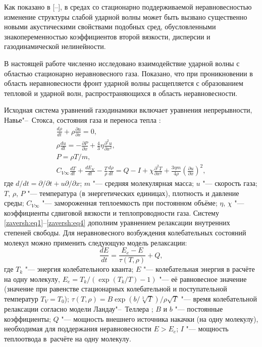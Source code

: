 Как показано в [--], в средах со стационарно поддерживаемой
неравновесностью изменение структуры слабой ударной волны может
быть вызвано существенно новыми акустическими свойствами подобных
сред, обусловленными знакопеременностью коэффициентов второй
вязкости, дисперсии и газодинамической нелинейности.

В настоящей работе   численно исследовано взаимодействие ударной
волны с областью стационарно неравновесного газа. Показано, что
при проникновении в область неравновесности фронт ударной волны
расщепляется с образованием тепловой и ударной волн,
распространяющихся в область неравновесности.

Исходная система уравнений газодинамики включает уравнения
непрерывности, Навье"--~Стокса, состояния газа и переноса тепла
\cite{zav:bib10,zav:bib11}:
     \begin{gather}
\frac{d\rho }{dt} +\rho \frac{\partial {u}}{\partial x}
=0,\label{zaversh:eq1}\\
\rho \frac{d{u}}{dt} =-\frac{\partial P}{\partial x} +\frac{4}{3}
\eta \frac{\partial^{2} {u}}{\partial x^{2}}
,\label{zaversh:eq2}\\
P=\rho T/m,\label{zaversh:eq3}\\
C_{V\infty } \frac{dT}{dt} +\frac{dE_{K} }{dt} -\frac{T}{\rho }
\frac{d\rho }{dt} =Q-I+\chi \frac{\partial^{2} T}{\partial x^{2}}
+\frac{3\eta m}{4\rho } \left(\frac{\partial {u}}{\partial x}
\right)^{2},\label{zaversh:eq4}
\end{gather}
где  $d/dt=\partial /\partial t+{u }\partial /\partial x$; $m$
"--- средняя молекулярная масса;  ${u}$  "--- скорость газа; $T$,
$\rho$, $P$  "--- температура (в энергетических единицах),
плотность и давление среды;  $C_{V\infty} $  "--- замороженная
теплоемкость при постоянном объёме;  $\eta$, $\chi $  "---
коэффициенты сдвиговой вязкости и теплопроводности газа. Систему \eqref{zaversh:eq1}--\eqref{zaversh:eq4} дополним уравнением релаксации внутренних степеней свободы. 
Для неравновесного возбуждения колебательных состояний молекул можно применить следующую модель релаксации:
\begin{equation}
\displaystyle \frac{dE}{dt} =\frac{E_{e} -E }{\tau(T,\rho )}
+Q,\label{zaversh:eq5}
\end{equation}
где $T_{k} $  "--- энергия колебательного кванта; $E$ "---
колебательная энергия в расчёте на одну молекулу, $E_e=T_k/(\exp
(T_k/T)-1)$ "--- её равновесное значение (значение при равенстве стационарных колебательной и поступательной температур $T_{V} =T_{0} $);   $\tau (T,\rho )=B\exp \left(b/\sqrt[{3}]{T}
\right)/\rho \sqrt{T} $  "--- время колебательной релаксации
согласно модели Ландау"--~Теллера \cite{zav:bib11}; $B$ и  $b$  "---
постоянные коэффициенты; $Q$ "--- мощность внешнего источника
накачки (на одну молекулу), необходимая для поддержания
неравновесности  $E >E_{e} $; $I$ "--- мощность теплоотвода в~расчёте на одну молекулу.

